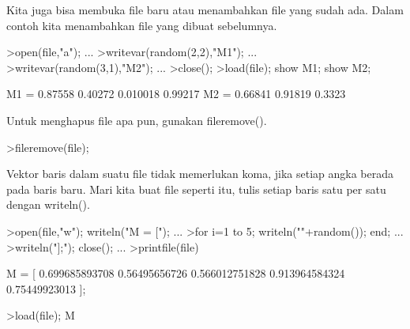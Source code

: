 \documentclass[a4paper,10pt]{article}
\begin{document}
\begin{eulernotebook}
\begin{eulercomment}
Kita juga bisa membuka file baru atau menambahkan file yang sudah ada.
Dalam contoh kita menambahkan file yang dibuat sebelumnya.
\end{eulercomment}
\begin{eulerprompt}
>open(file,"a"); ...
>writevar(random(2,2),"M1"); ...
>writevar(random(3,1),"M2"); ...
>close();
>load(file); show M1; show M2;
\end{eulerprompt}
\begin{euleroutput}
  M1 = 
    0.87558   0.40272 
   0.010018   0.99217 
  M2 = 
    0.66841 
    0.91819 
     0.3323 
\end{euleroutput}
\begin{eulercomment}
Untuk menghapus file apa pun, gunakan fileremove().
\end{eulercomment}
\begin{eulerprompt}
>fileremove(file);
\end{eulerprompt}
\begin{eulercomment}
Vektor baris dalam suatu file tidak memerlukan koma, jika setiap angka
berada pada baris baru. Mari kita buat file seperti itu, tulis setiap
baris satu per satu dengan writeln().
\end{eulercomment}
\begin{eulerprompt}
>open(file,"w"); writeln("M = ["); ...
>for i=1 to 5; writeln(""+random()); end; ...
>writeln("];"); close(); ...
>printfile(file)
\end{eulerprompt}
\begin{euleroutput}
  M = [
  0.699685893708
  0.56495656726
  0.566012751828
  0.913964584324
  0.75449923013
  ];
\end{euleroutput}
\begin{eulerprompt}
>load(file); M
\end{eulerprompt}
\begin{euleroutput}
  [0.69969,  0.56496,  0.56601,  0.91396,  0.7545]
\end{euleroutput}
\end{eulernotebook}
\end{document}
